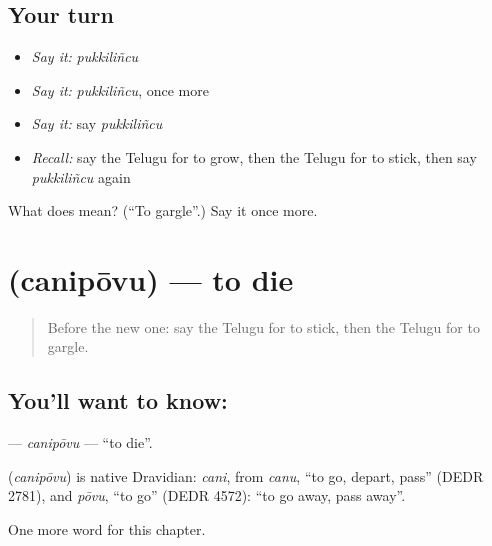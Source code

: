 \subsection*{Your turn}
\begin{itemize}
\raggedright
  \item \emph{Say it:} \emph{pukkiliñcu}
  \item \emph{Say it:} \emph{pukkiliñcu}, once more
  \item \emph{Say it:} say \emph{pukkiliñcu}
  \item \emph{Recall:} say the Telugu for to grow, then the Telugu for to stick, then say \emph{pukkiliñcu} again
\end{itemize}

\begin{tcolorbox}[breakable,colback=teal!4,colframe=teal!35!black,title={Before you move on}]
What does  mean? (\textquotedblleft{}To gargle\textquotedblright{}.) Say it once more.
\end{tcolorbox}
\section[\texorpdfstring{\te{చనిపోవు} (canipōvu)}{చనిపోవు (canipōvu)}]{ (canipōvu) — to die}

\label{lesson:TE-C208-canipovu}



\begin{quote}
Before the new one: say the Telugu for to stick, then the Telugu for to gargle.
\end{quote}

\subsection*{You'll want to know: }
\textbf{} — \emph{canipōvu} — \textquotedblleft{}to die\textquotedblright{}.

\begin{cousinweb}
\textbf{} (\emph{canipōvu}) is native Dravidian: \emph{cani}, from \emph{canu}, \textquotedblleft{}to go, depart, pass\textquotedblright{} (DEDR 2781), and \emph{pōvu}, \textquotedblleft{}to go\textquotedblright{} (DEDR 4572): \textquotedblleft{}to go away, pass away\textquotedblright{}.
\end{cousinweb}

\begin{grammarlens}[title={What you've built}]
One more word for this chapter.
\end{grammarlens}

